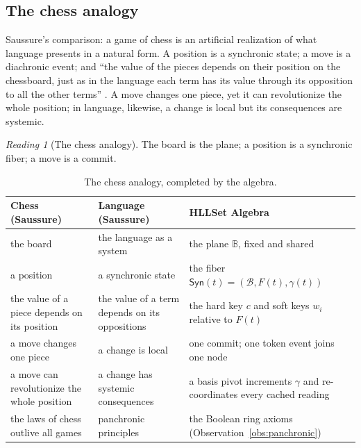 \documentclass[11pt,a4paper]{article}
\theoremstyle{remark}
\newtheorem{reading}[principle]{Reading}
\newcommand{\Plane}{\ensuremath{\mathbb{B}}}            %
\newcommand{\Lat}{\ensuremath{\mathcal{B}}}              %
\newcommand{\Sync}{\ensuremath{\mathsf{Syn}}}            %
\newcommand{\Gen}{\ensuremath{\gamma}}                   %
\begin{document}
\subsection{The chess analogy}
\label{sec:chess}

Saussure's comparison: a game of chess is an artificial realization of what
language presents in a natural form. A position is a synchronic state; a move
is a diachronic event; and ``the value of the pieces depends on their position
on the chessboard, just as in the language each term has its value through its
opposition to all the other terms'' \cite[Part I, ch.~III, \S5]{harris1983}.
A move changes one piece, yet it can revolutionize the whole position; in
language, likewise, a change is local but its consequences are systemic.

\begin{reading}[The chess analogy]
\label{read:chess}
The board is the plane; a position is a synchronic fiber; a move is a commit.
\end{reading}

\begin{table}[htbp]
\centering
\begin{tabular}{@{}>{\raggedright\arraybackslash}p{4.2cm}
                    >{\raggedright\arraybackslash}p{5.0cm}
                    >{\raggedright\arraybackslash}p{5.8cm}@{}}
\toprule
Chess (Saussure) & Language (Saussure) & HLLSet Algebra \\
\midrule
the board & the language as a system & the plane $\Plane$, fixed and shared \\
a position & a synchronic state & the fiber $\Sync(t) = (\Lat, F(t), \Gen(t))$ \\
the value of a piece depends on its position & the value of a term depends on its oppositions & the hard key $c$ and soft keys $w_i$ relative to $F(t)$ \\
a move changes one piece & a change is local & one commit; one token event joins one node \\
a move can revolutionize the whole position & a change has systemic consequences & a basis pivot increments $\Gen$ and re-coordinates every cached reading \cite{state2026} \\
the laws of chess outlive all games & panchronic principles & the Boolean ring axioms (Observation~\ref{obs:panchronic}) \\
\bottomrule
\end{tabular}
\caption{The chess analogy, completed by the algebra.}
\label{tab:chess}
\end{table}
\end{document}
